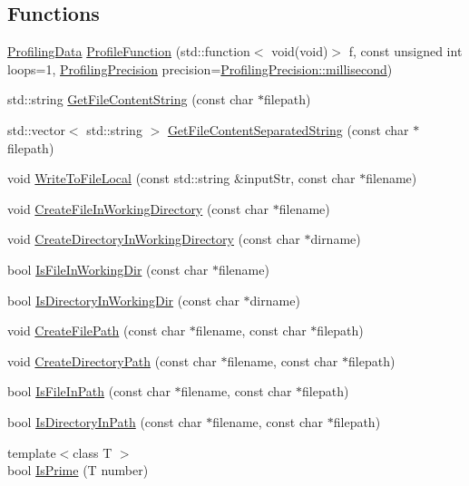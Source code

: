 \subsection*{Functions}
\begin{DoxyCompactItemize}
\item 
\mbox{\hyperlink{structutl_1_1_profiling_data}{Profiling\+Data}} \mbox{\hyperlink{namespaceutl_a414d8db340d2163b038d367b84747435}{Profile\+Function}} (std\+::function$<$ void(void)$>$ f, const unsigned int loops=1, \mbox{\hyperlink{namespaceutl_ad221bb3fac593651670bdc0263b92707}{Profiling\+Precision}} precision=\mbox{\hyperlink{namespaceutl_ad221bb3fac593651670bdc0263b92707a407aa8403e413c457b081a9dc095a285}{Profiling\+Precision\+::millisecond}})
\item 
std\+::string \mbox{\hyperlink{namespaceutl_ae679726d5c99421e9628a5f8e29197de}{Get\+File\+Content\+String}} (const char $\ast$filepath)
\item 
std\+::vector$<$ std\+::string $>$ \mbox{\hyperlink{namespaceutl_a43da5b11cd73ebbd81588991b1971a42}{Get\+File\+Content\+Separated\+String}} (const char $\ast$filepath)
\item 
void \mbox{\hyperlink{namespaceutl_a32ce5d71ca3cd937dab875e706f48a6a}{Write\+To\+File\+Local}} (const std\+::string \&input\+Str, const char $\ast$filename)
\item 
void \mbox{\hyperlink{namespaceutl_adf4c2376b83a6713eaceb14c89b53f6a}{Create\+File\+In\+Working\+Directory}} (const char $\ast$filename)
\item 
void \mbox{\hyperlink{namespaceutl_a46d596900fabb65e6281dd634065dbf8}{Create\+Directory\+In\+Working\+Directory}} (const char $\ast$dirname)
\item 
bool \mbox{\hyperlink{namespaceutl_a4885b4fd5be2d785d8afa24b8dec7a65}{Is\+File\+In\+Working\+Dir}} (const char $\ast$filename)
\item 
bool \mbox{\hyperlink{namespaceutl_a08653a6121d035c63a92c85dd6c4a7cb}{Is\+Directory\+In\+Working\+Dir}} (const char $\ast$dirname)
\item 
void \mbox{\hyperlink{namespaceutl_abf27aab9016dc2fb9f8b8049644276d7}{Create\+File\+Path}} (const char $\ast$filename, const char $\ast$filepath)
\item 
void \mbox{\hyperlink{namespaceutl_a3815036b0f9a13c874992104948198f6}{Create\+Directory\+Path}} (const char $\ast$filename, const char $\ast$filepath)
\item 
bool \mbox{\hyperlink{namespaceutl_adfea5967bd695c054be448927fc5cdf3}{Is\+File\+In\+Path}} (const char $\ast$filename, const char $\ast$filepath)
\item 
bool \mbox{\hyperlink{namespaceutl_a57a0860162f815b9ca54137b8f92f051}{Is\+Directory\+In\+Path}} (const char $\ast$filename, const char $\ast$filepath)
\item 
{\footnotesize template$<$class T $>$ }\\bool \mbox{\hyperlink{namespaceutl_ad20146756b17b6333c436922702f26b6}{Is\+Prime}} (T number)
\end{DoxyCompactItemize}


